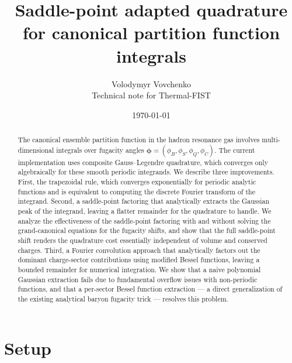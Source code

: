 \documentclass[11pt,a4paper]{article}
\title{Saddle-point adapted quadrature for canonical partition function integrals}
\author{Volodymyr Vovchenko \\ {\small Technical note for Thermal-FIST}}
\date{\today}
\newcommand{\bphi}{\bm{\phi}}
\begin{document}
\maketitle

\begin{abstract}
The canonical ensemble partition function in the hadron resonance gas involves multi-dimensional integrals over fugacity angles $\bphi = (\phi_B, \phi_S, \phi_Q, \phi_C)$.
The current implementation uses composite Gauss--Legendre quadrature, which converges only algebraically for these smooth periodic integrands.
We describe three improvements.
First, the trapezoidal rule, which converges exponentially for periodic analytic functions and is equivalent to computing the discrete Fourier transform of the integrand.
Second, a saddle-point factoring that analytically extracts the Gaussian peak of the integrand, leaving a flatter remainder for the quadrature to handle.
We analyze the effectiveness of the saddle-point factoring with and without solving the grand-canonical equations for the fugacity shifts, and show that the full saddle-point shift renders the quadrature cost essentially independent of volume and conserved charges.
Third, a Fourier convolution approach that analytically factors out the dominant charge-sector contributions using modified Bessel functions, leaving a bounded remainder for numerical integration.
We show that a naive polynomial Gaussian extraction fails due to fundamental overflow issues with non-periodic functions, and that a per-sector Bessel function extraction --- a direct generalization of the existing analytical baryon fugacity trick --- resolves this problem.
\end{abstract}

\tableofcontents


\section{Setup}
\label{sec:setup}
\end{document}
